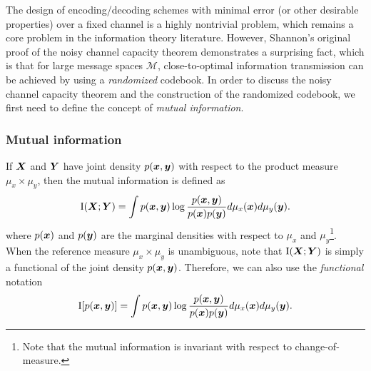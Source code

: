 The design of encoding/decoding schemes with minimal error (or other
desirable properties) over a fixed channel is a highly nontrivial
problem, which remains a core problem in the information theory
literature.  However, Shannon's original proof of the noisy channel
capacity theorem demonstrates a surprising fact, which is that for
large message spaces $\mathcal{M}$, close-to-optimal information
transmission can be achieved by using a \emph{randomized} codebook.
In order to discuss the noisy channel capacity theorem and the
construction of the randomized codebook, we first need to define
the concept of \emph{mutual information}.

\subsubsection{Mutual information}

If $\boldsymbol{X}$ and $\boldsymbol{Y}$ have joint density $p(\boldsymbol{x}, \boldsymbol{y})$ with respect to
the product measure $\mu_x \times \mu_y$, then the mutual information
is defined as
\[
\text{I}(\boldsymbol{X};\boldsymbol{Y}) = \int p(\boldsymbol{x}, \boldsymbol{y}) \log \frac{p(\boldsymbol{x}, \boldsymbol{y})}{p(\boldsymbol{x})p(\boldsymbol{y})}d\mu_x(\boldsymbol{x}) d\mu_y(\boldsymbol{y}).
\]
where $p(\boldsymbol{x})$ and $p(\boldsymbol{y})$ are the marginal densities with respect to
$\mu_x$ and $\mu_y$\footnote{Note that the mutual information is
  invariant with respect to change-of-measure.}.  When the reference
measure $\mu_x \times \mu_y$ is unambiguous, note that $\text{I}(\boldsymbol{X};\boldsymbol{Y})$ is
simply a functional of the joint density $p(\boldsymbol{x}, \boldsymbol{y})$.  Therefore, we
can also use the \emph{functional} notation
\[
\text{I}[p(\boldsymbol{x}, \boldsymbol{y})] = \int p(\boldsymbol{x}, \boldsymbol{y}) \log \frac{p(\boldsymbol{x}, \boldsymbol{y})}{p(\boldsymbol{x})p(\boldsymbol{y})}d\mu_x(\boldsymbol{x}) d\mu_y(\boldsymbol{y}).
\]


